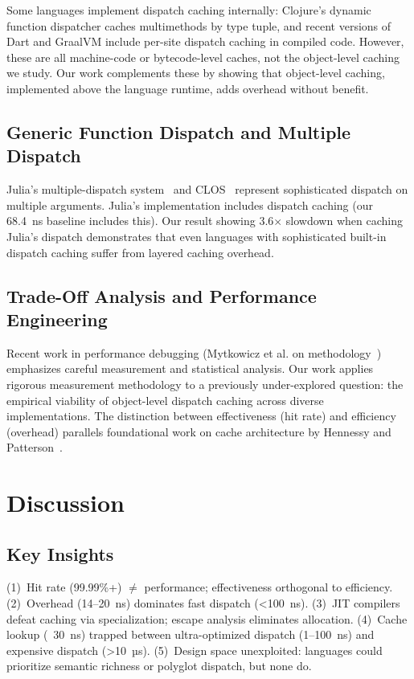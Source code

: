 \documentclass[sigplan,final,acmsmall,review,screen]{acmart}
\begin{document}
Some languages implement dispatch caching internally: Clojure's dynamic function dispatcher caches multimethods by type tuple, and recent versions of Dart and GraalVM include per-site dispatch caching in compiled code. However, these are all machine-code or bytecode-level caches, not the object-level caching we study. Our work complements these by showing that object-level caching, implemented above the language runtime, adds overhead without benefit.

\subsection{Generic Function Dispatch and Multiple Dispatch}

Julia's multiple-dispatch system~\cite{julia-lang} and CLOS~\cite{keene1989object} represent sophisticated dispatch on multiple arguments. Julia's implementation includes dispatch caching (our 68.4~ns baseline includes this). Our result showing 3.6$\times$ slowdown when caching Julia's dispatch demonstrates that even languages with sophisticated built-in dispatch caching suffer from layered caching overhead.

\subsection{Trade-Off Analysis and Performance Engineering}

Recent work in performance debugging (Mytkowicz et al. on methodology~\cite{mytkowicz2009producing}) emphasizes careful measurement and statistical analysis. Our work applies rigorous measurement methodology to a previously under-explored question: the empirical viability of object-level dispatch caching across diverse implementations. The distinction between effectiveness (hit rate) and efficiency (overhead) parallels foundational work on cache architecture by Hennessy and Patterson~\cite{hennessy2011computer}.

\section{Discussion}
\label{sec:discussion}

\subsection{Key Insights}

(1)~Hit rate (99.99\%+) $\neq$ performance; effectiveness orthogonal to efficiency. (2)~Overhead (14--20~ns) dominates fast dispatch (<100~ns). (3)~JIT compilers defeat caching via specialization; escape analysis eliminates allocation. (4)~Cache lookup (~30~ns) trapped between ultra-optimized dispatch (1--100~ns) and expensive dispatch (>10~µs). (5)~Design space unexploited: languages could prioritize semantic richness or polyglot dispatch, but none do.
\end{document}
